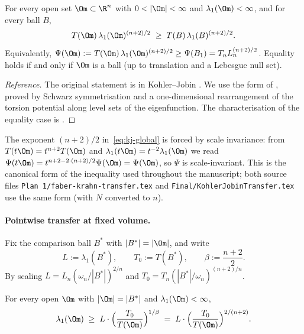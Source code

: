 \begin{theorem}\label{thm:kj}
For every open set $\Om\subset\R^n$ with $0<|\Om|<\infty$ and
$\lambda_1(\Om)<\infty$, and for every ball $B$,
\begin{equation}\label{eq:kj-global}
T(\Om)\,\lambda_1(\Om)^{(n+2)/2}
\;\ge\; T(B)\,\lambda_1(B)^{(n+2)/2}.
\end{equation}
Equivalently, $\Psi(\Om):=T(\Om)\,\lambda_1(\Om)^{(n+2)/2}\ge
\Psi(B_1)=T_n L_n^{(n+2)/2}$. Equality holds if and only if $\Om$ is a
ball (up to translation and a Lebesgue null set).
\end{theorem}

\begin{proof}[Reference]
The original statement is in Kohler--Jobin \cite{KohlerJobin1978}. We
use the form of \cite[Theorem~3.3, p.~322]{Brasco2014}, proved by
Schwarz symmetrisation and a one-dimensional rearrangement of the
torsion potential along level sets of the eigenfunction. The
characterisation of the equality case is \cite[Theorem~3.3]{Brasco2014}.
\end{proof}

\begin{remark}\label{rem:kj-canonical}
The exponent $(n+2)/2$ in~\eqref{eq:kj-global} is forced by scale
invariance: from $T(t\Om)=t^{n+2}T(\Om)$ and
$\lambda_1(t\Om)=t^{-2}\lambda_1(\Om)$ we read
$\Psi(t\Om)=t^{n+2-2\cdot(n+2)/2}\Psi(\Om)=\Psi(\Om)$, so $\Psi$ is
scale-invariant. This is the canonical form of the inequality used
throughout the manuscript; both source files
\texttt{Plan~1/faber-krahn-transfer.tex} and
\texttt{Final/KohlerJobinTransfer.tex} use the same form
(with $N$ converted to $n$).
\end{remark}

\paragraph{Pointwise transfer at fixed volume.} Fix the comparison ball
$B^*$ with $|B^*|=|\Om|$, and write
\[
L:=\lambda_1(B^*),\qquad T_0:=T(B^*),\qquad \beta:=\frac{n+2}{2}.
\]
By scaling $L=L_n(\omega_n/|B^*|)^{2/n}$ and
$T_0=T_n(|B^*|/\omega_n)^{(n+2)/n}$.

\begin{lemma}\label{lem:KJ-ptwise}
For every open $\Om$ with $|\Om|=|B^*|$ and $\lambda_1(\Om)<\infty$,
\begin{equation}\label{eq:plan1-KJ-ptwise}
\lambda_1(\Om)
\;\ge\; L\cdot\Bigl(\frac{T_0}{T(\Om)}\Bigr)^{1/\beta}
\;=\; L\cdot\Bigl(\frac{T_0}{T(\Om)}\Bigr)^{2/(n+2)}.
\end{equation}
\end{lemma}

